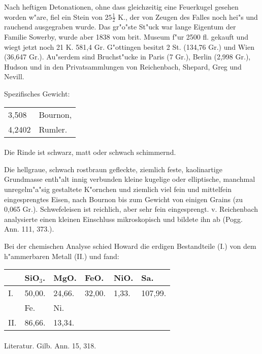 \documentclass[a4paper, 11pt, oneside]{article}
\begin{document}
Nach heftigen Detonationen, ohne dass gleichzeitig eine Feuerkugel gesehen worden w"are, fiel ein Stein von $25\frac{1}{2}$ K., der von Zeugen des Falles noch hei"s und rauchend ausgegraben wurde. Das gr"o"ste St"uck war lange Eigentum der Familie Sowerby, wurde aber 1838 vom brit. Museum f"ur 2500 fl. gekauft und wiegt jetzt noch 21 K. 581,4 Gr. G"ottingen besitzt 2 St. (134,76 Gr.) und Wien (36,647 Gr.). Au"serdem sind Bruchst"ucke in Paris (7 Gr.), Berlin (2,998 Gr.), Hudson und in den Privatsammlungen von Reichenbach, Shepard, Greg und Nevill.

Spezifisches Gewicht:
\begin{table}[!ht]
    \centering
    \begin{tabular}{l l}
        3,508 & Bournon,\\
        4,2402 & Rumler.
    \end{tabular}
\end{table}
\paragraph{}
Die Rinde ist schwarz, matt oder schwach schimmernd.

Die hellgraue, schwach rostbraun gefleckte, ziemlich feste, kaolinartige Grundmasse enth"alt innig verbunden kleine kugelige oder elliptische, manchmal unregelm"a"sig gestaltete K"ornchen und ziemlich viel fein und mittelfein eingesprengtes Eisen, nach Bournon bis zum Gewicht von einigen Grains (zu 0,065 Gr.). Schwefeleisen ist reichlich, aber sehr fein eingesprengt. v. Reichenbach analysierte einen kleinen Einschluss mikroskopisch und bildete ihn ab (Pogg. Ann. 111, 373.).

Bei der chemischen Analyse schied Howard die erdigen Bestandteile (I.) von dem h"ammerbaren Metall (II.) und fand:
\begin{table}[H]
    \centering
    \begin{tabular}{l l l l l l}
         & SiO$_{3}$. & MgO. & FeO. & NiO. & Sa. \\ \hline
        I. & 50,00. & 24,66. & 32,00. & 1,33. & 107,99. \\
         & Fe. & Ni. &  &  &  \\
        II. & 86,66. & 13,34. &  &  &  \\
    \end{tabular}
\end{table}
\footnotesize
\paragraph{}
Literatur. Gilb. Ann. 15, 318.
\end{document}
